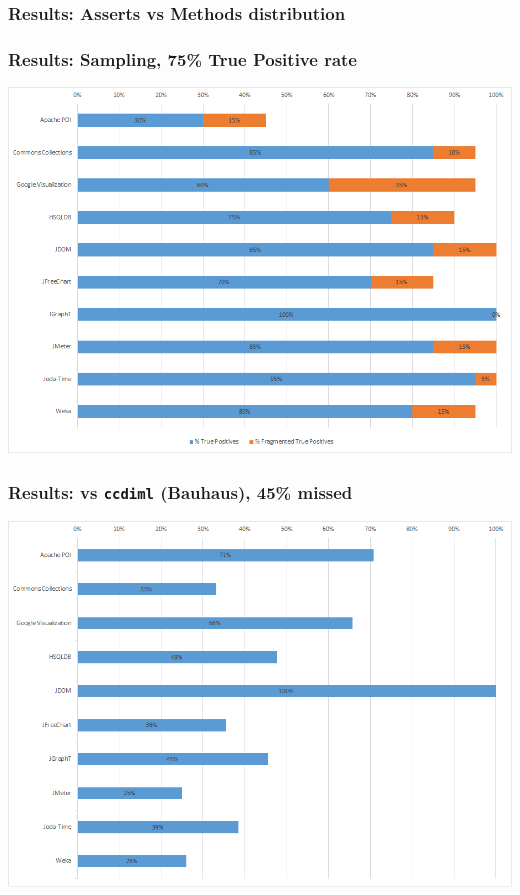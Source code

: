 \documentclass{beamer}
\begin{document}
\begin{frame}
\frametitle{Results: Asserts vs Methods distribution} {
   \hspace*{0em}
%     
   }
\end{frame}

\begin{frame}
\frametitle{Results: Sampling, 75\% True Positive rate} {
   \includegraphics[width=\textwidth, keepaspectratio=true]{images/percent_true_positives.png}
   }
\end{frame}

\begin{frame}
\frametitle{Results: vs {\tt ccdiml} (Bauhaus), 45\% missed} {
   \includegraphics[width=\textwidth, keepaspectratio=true]{images/percent_not_ccdiml.png}
   }
\end{frame}
\end{document}
